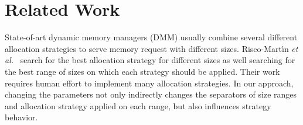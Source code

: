 \section{Related Work}

State-of-art dynamic memory managers (DMM) usually combine several
different allocation strategies to serve memory request with different
sizes. Risco-Mart\'{\i}n \emph{et al.}~\cite{RiscoMartín2014109,
Colmenar:2011:MOD:2001576.2001820} search for the best allocation strategy
for different sizes as well searching for the best range of sizes on which
each strategy should be applied. 
Their work requires human effort to implement many
allocation strategies. In our approach, changing the parameters not
only indirectly changes the separators of size ranges and allocation
strategy applied on each range, but also influences strategy behavior. 



